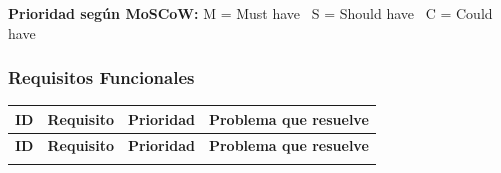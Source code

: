 \documentclass[11pt,letterpaper]{article}
\begin{document}
\textbf{Prioridad según MoSCoW:} M = Must have \textperiodcentered\ S = Should have \textperiodcentered\ C = Could have

\subsubsection*{Requisitos Funcionales}

\begin{longtable}{|c|p{6.5cm}|c|p{5.5cm}|}
\hline
\textbf{ID} & \textbf{Requisito} & \textbf{Prioridad} & \textbf{Problema que resuelve} \\
\hline
\endfirsthead

\hline
\textbf{ID} & \textbf{Requisito} & \textbf{Prioridad} & \textbf{Problema que resuelve} \\
\hline
\endhead

\hline
\endfoot

\endlastfoot


\end{longtable}
\end{document}
